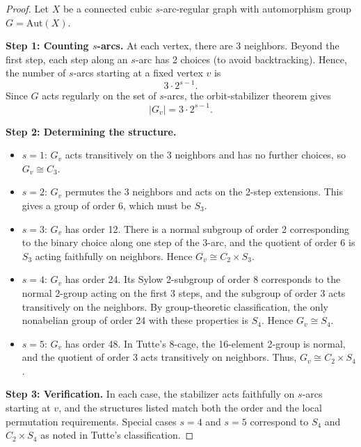 \documentclass[12pt,a4paper,openany]{book}
\begin{document}
\begin{proof}
Let $X$ be a connected cubic $s$-arc-regular graph with automorphism group $G = \mathrm{Aut}(X)$.

\medskip
\textbf{Step 1: Counting $s$-arcs.}  
At each vertex, there are 3 neighbors. Beyond the first step, each step along an $s$-arc has 2 choices (to avoid backtracking).  
Hence, the number of $s$-arcs starting at a fixed vertex $v$ is
\[
3 \cdot 2^{s-1}.
\]
Since $G$ acts regularly on the set of $s$-arcs, the orbit-stabilizer theorem gives
\[
|G_v| = 3 \cdot 2^{s-1}.
\]

\medskip
\textbf{Step 2: Determining the structure.}  

\begin{itemize}
    \item $s=1$: $G_v$ acts transitively on the 3 neighbors and has no further choices, so $G_v \cong C_3$.
    
    \item $s=2$: $G_v$ permutes the 3 neighbors and acts on the 2-step extensions. This gives a group of order 6, which must be $S_3$.
    
    \item $s=3$: $G_v$ has order 12. There is a normal subgroup of order 2 corresponding to the binary choice along one step of the 3-arc, and the quotient of order 6 is $S_3$ acting faithfully on neighbors. Hence $G_v \cong C_2 \times S_3$.
    
    \item $s=4$: $G_v$ has order 24. Its Sylow 2-subgroup of order 8 corresponds to the normal 2-group acting on the first 3 steps, and the subgroup of order 3 acts transitively on the neighbors. By group-theoretic classification, the only nonabelian group of order 24 with these properties is $S_4$. Hence $G_v \cong S_4$.
    
    \item $s=5$: $G_v$ has order 48. In Tutte's 8-cage, the 16-element 2-group is normal, and the quotient of order 3 acts transitively on neighbors. Thus, $G_v \cong C_2 \times S_4$.
\end{itemize}

\medskip
\textbf{Step 3: Verification.}  
In each case, the stabilizer acts faithfully on $s$-arcs starting at $v$, and the structures listed match both the order and the local permutation requirements. Special cases \(s=4\) and \(s=5\) correspond to $S_4$ and $C_2 \times S_4$ as noted in Tutte’s classification.
\end{proof}
\end{document}
